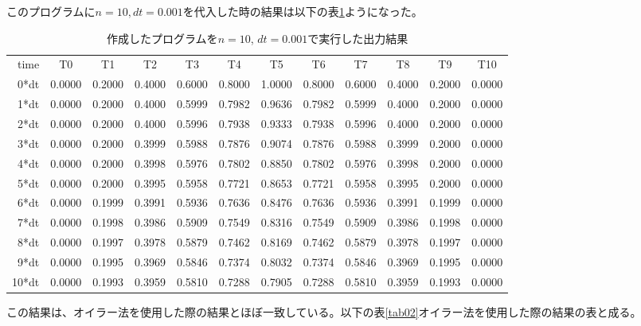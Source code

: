 \documentclass{jsarticle}
\begin{document}
このプログラムに$n=10, dt=0.001$を代入した時の結果は以下の表\ref{tab01}ようになった。
\begin{table}[H]
	\caption[出力結果]{作成したプログラムを$n=10$, $dt=0.001$で実行した出力結果}
	\label{tab01}
	\begin{center}
		\setlength{\tabcolsep}{3pt}
		\footnotesize
		\begin{tabular}{rccccccccccc}
			time & T0 & T1 & T2 & T3 & T4 & T5 & T6 & T7 & T8 & T9 & T10 \\
			0*dt & 0.0000 & 0.2000 & 0.4000 & 0.6000 & 0.8000 & 1.0000 & 0.8000 & 0.6000 & 0.4000 & 0.2000 & 0.0000 \\
			1*dt & 0.0000 & 0.2000 & 0.4000 & 0.5999 & 0.7982 & 0.9636 & 0.7982 & 0.5999 & 0.4000 & 0.2000 & 0.0000 \\
			2*dt & 0.0000 & 0.2000 & 0.4000 & 0.5996 & 0.7938 & 0.9333 & 0.7938 & 0.5996 & 0.4000 & 0.2000 & 0.0000 \\
			3*dt & 0.0000 & 0.2000 & 0.3999 & 0.5988 & 0.7876 & 0.9074 & 0.7876 & 0.5988 & 0.3999 & 0.2000 & 0.0000 \\
			4*dt & 0.0000 & 0.2000 & 0.3998 & 0.5976 & 0.7802 & 0.8850 & 0.7802 & 0.5976 & 0.3998 & 0.2000 & 0.0000 \\
			5*dt & 0.0000 & 0.2000 & 0.3995 & 0.5958 & 0.7721 & 0.8653 & 0.7721 & 0.5958 & 0.3995 & 0.2000 & 0.0000 \\
			6*dt & 0.0000 & 0.1999 & 0.3991 & 0.5936 & 0.7636 & 0.8476 & 0.7636 & 0.5936 & 0.3991 & 0.1999 & 0.0000 \\
			7*dt & 0.0000 & 0.1998 & 0.3986 & 0.5909 & 0.7549 & 0.8316 & 0.7549 & 0.5909 & 0.3986 & 0.1998 & 0.0000 \\
			8*dt & 0.0000 & 0.1997 & 0.3978 & 0.5879 & 0.7462 & 0.8169 & 0.7462 & 0.5879 & 0.3978 & 0.1997 & 0.0000 \\
			9*dt & 0.0000 & 0.1995 & 0.3969 & 0.5846 & 0.7374 & 0.8032 & 0.7374 & 0.5846 & 0.3969 & 0.1995 & 0.0000 \\
			10*dt & 0.0000 & 0.1993 & 0.3959 & 0.5810 & 0.7288 & 0.7905 & 0.7288 & 0.5810 & 0.3959 & 0.1993 & 0.0000 \\
		\end{tabular}
	\end{center}
\end{table}
この結果は、オイラー法を使用した際の結果とほぼ一致している。以下の表\ref{tab02}オイラー法を使用した際の結果の表と成る。
\end{document}
